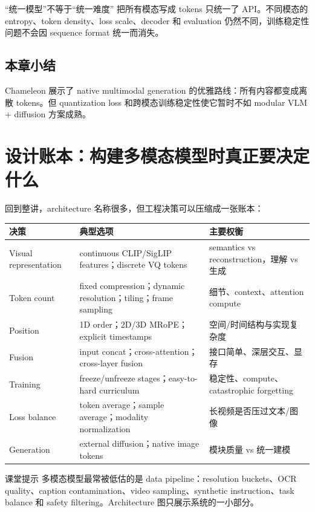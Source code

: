 \documentclass[a4paper]{article}
\begin{document}
\begin{warningbox}{“统一模型”不等于“统一难度”}
把所有模态写成 tokens 只统一了 API。不同模态的 entropy、token density、loss scale、decoder 和 evaluation 仍然不同，训练稳定性问题不会因 sequence format 统一而消失。
\end{warningbox}

\subsection{本章小结}

Chameleon 展示了 native multimodal generation 的优雅路线：所有内容都变成离散 tokens。但 quantization loss 和跨模态训练稳定性使它暂时不如 modular VLM + diffusion 方案成熟。

\section{设计账本：构建多模态模型时真正要决定什么}

回到整讲，architecture 名称很多，但工程决策可以压缩成一张账本：

\begin{longtable}{L{0.18\textwidth}L{0.34\textwidth}L{0.38\textwidth}}
\toprule
决策 & 典型选项 & 主要权衡 \\
\midrule
Visual representation & continuous CLIP/SigLIP features；discrete VQ tokens & semantics vs reconstruction，理解 vs 生成 \\
Token count & fixed compression；dynamic resolution；tiling；frame sampling & 细节、context、attention compute \\
Position & 1D order；2D/3D MRoPE；explicit timestamps & 空间/时间结构与实现复杂度 \\
Fusion & input concat；cross-attention；cross-layer fusion & 接口简单、深层交互、显存 \\
Training & freeze/unfreeze stages；easy-to-hard curriculum & 稳定性、compute、catastrophic forgetting \\
Loss balance & token average；sample average；modality normalization & 长视频是否压过文本/图像 \\
Generation & external diffusion；native image tokens & 模块质量 vs 统一建模 \\
\bottomrule
\end{longtable}

\begin{knowledgebox}{课堂提示}
多模态模型最常被低估的是 data pipeline：resolution buckets、OCR quality、caption contamination、video sampling、synthetic instruction、task balance 和 safety filtering。Architecture 图只展示系统的一小部分。
\end{knowledgebox}
\end{document}

